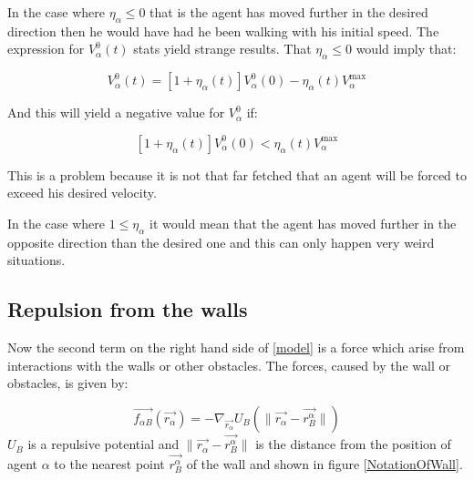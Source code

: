 \begin{itemize}
In the case where $\eta_{\alpha} \leq 0$ that is the agent has moved further 
in the desired direction then he would have had he been walking with his 
initial speed. The expression for $V_{\alpha}^{0} \left( t \right)$
stats yield strange results. That $\eta_{\alpha} \leq 0$ would imply that:

\begin{equation}\label{n}
    V_{\alpha}^{0} \left( t\right) = \left[ 1 + \eta_{\alpha} \left( t \right) \right] 
    V_{\alpha}^{0} \left( 0 \right) -
    \eta_{\alpha} \left( t \right)V_{\alpha}^{\text{max}}
\end{equation}

And this will yield a negative value for $V_{\alpha}^{0}$ if: 

\begin{equation}
\left[ 1 + \eta_{\alpha} \left( t \right) \right] 
V_{\alpha}^{0} \left( 0 \right) < \eta_{\alpha} \left( t \right)V_{\alpha}^{\text{max}} 
\end{equation}

This is a problem because it is not that far fetched that an agent will be 
forced to exceed his desired velocity.

In the case where $1 \leq \eta_{\alpha}$ it would mean that the agent has moved 
further in the opposite direction than the desired one and this can only happen very 
weird situations.
\end{itemize}






\subsection{Repulsion from the walls}
Now the second term on the right hand side of \eqref{model} is a force which arise from interactions with the walls or other obstacles. The forces, caused by the wall or obstacles, is given by:

\begin{equation}\label{wallpotential}
    \vec{f_{\alpha B}} \left( \vec{r_{\alpha}} \right) =
    - \nabla_{\vec{r_{\alpha}}} U_{B}
    \left( \| \vec{r_{\alpha}} - \vec{r_{B}^{\alpha}} \| \right)
\end{equation}
$U_B$ is a repulsive potential and $ \| \vec{r_{\alpha}} - \vec{r_{B}^{\alpha}} \|$ is the distance 
from the position of agent $\alpha$ to the nearest point $ \vec{r_{B}^{\alpha}}  $ of the wall and shown in figure \ref{NotationOfWall}.

